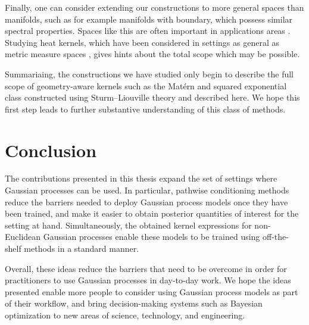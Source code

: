 \documentclass[11pt]{book}
\begin{document}
Finally, one can consider extending our constructions to more general spaces than manifolds, such as for example manifolds with boundary, which possess similar spectral properties.
Spaces like this are often important in applications areas \cite{solin18,krainski18,solin19,coveney20}.
Studying heat kernels, which have been considered in settings as general as metric measure spaces \cite{grigoryan03,grigoryan14}, gives hints about the total scope which may be possible.

Summariaing, the constructions we have studied only begin to describe the full scope of geometry-aware kernels such as the Matérn and squared exponential class constructed using Sturm--Liouville theory and described here.
We hope this first step leads to further substantive understanding of this class of methods.

\section{Conclusion}

The contributions presented in this thesis expand the set of settings where Gaussian processes can be used.
In particular, pathwise conditioning methods reduce the barriers needed to deploy Gaussian process models once they have been trained, and make it easier to obtain posterior quantities of interest for the setting at hand.
Simultaneously, the obtained kernel expressions for non-Euclidean Gaussian processes enable these models to be trained using off-the-shelf methods in a standard manner.

Overall, these ideas reduce the barriers that need to be overcome in order for practitioners to use Gaussian processes in day-to-day work.
We hope the ideas presented enable more people to consider using Gaussian process models as part of their workflow, and bring decision-making systems such as Bayesian optimization to new areas of science, technology, and engineering.



\printbibliography[heading=bibintoc,title={References}]
\end{document}
